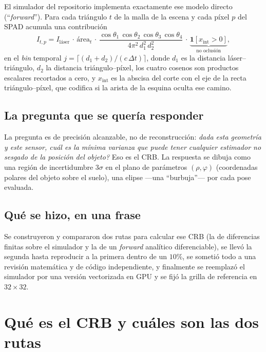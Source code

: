 \documentclass[11pt,a4paper]{article}
\theoremstyle{definition}
\begin{document}
El simulador del repositorio implementa exactamente ese modelo directo
(\enquote{\emph{forward}}). Para cada triángulo $t$ de la malla de la escena y cada
píxel $p$ del SPAD acumula una contribución
%
\begin{equation}
\label{eq:forward-duro}
I_{t,p}
= I_{\text{láser}}\,\cdot\,\text{área}_t\,\cdot\,
\frac{\cos\theta_1\,\cos\theta_2\,\cos\theta_3\,\cos\theta_4}
     {4\pi^2\, d_1^2\, d_2^2}\,\cdot\,
\underbrace{\mathbf{1}[x_{\text{int}}>0]}_{\text{no oclusión}},
\end{equation}
%
en el \emph{bin} temporal
$j=\lceil (d_1+d_2)/(c\,\Delta t)\rceil$, donde $d_1$ es la distancia
láser--triángulo, $d_2$ la distancia triángulo--píxel, los cuatro cosenos son
productos escalares recortados a cero, y $x_{\text{int}}$ es la abscisa del
corte con el eje de la recta triángulo--píxel, que codifica si la arista de la
esquina oculta ese camino.

\subsection{La pregunta que se quería responder}

La pregunta es de precisión alcanzable, no de reconstrucción: \emph{dada esta
geometría y este sensor, \textquestiondown{}cuál es la mínima varianza que puede tener cualquier
estimador no sesgado de la posición del objeto?} Eso es el CRB. La respuesta se
dibuja como una región de incertidumbre $3\sigma$ en el plano de parámetros
$(\rho,\varphi)$ (coordenadas polares del objeto sobre el suelo), una elipse
---una \enquote{burbuja}--- por cada pose evaluada.

\subsection{Qué se hizo, en una frase}

Se construyeron y compararon dos rutas para calcular ese CRB (la de diferencias
finitas sobre el simulador y la de un \emph{forward} analítico diferenciable),
se llevó la segunda hasta reproducir a la primera dentro de un $10\%$, se
sometió todo a una revisión matemática y de código independiente, y finalmente
se reemplazó el simulador por una versión vectorizada en GPU y se fijó la
grilla de referencia en $32\times32$.

\section{Qué es el CRB y cuáles son las dos rutas}
\label{sec:crb}
\end{document}
